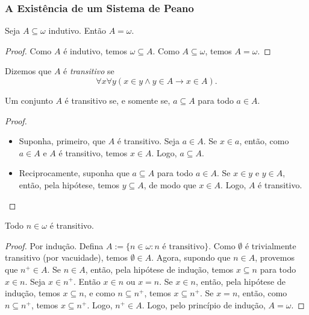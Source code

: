 \subsubsection{A Existência de um Sistema de Peano}

\begin{theorem} \label{teo.set:omega_indução}
    Seja $A \subseteq \omega$ indutivo. Então $A = \omega$.
\end{theorem}

\begin{proof}
    Como $A$ é indutivo, temos $\omega \subseteq A$. Como $A \subseteq \omega$, temos $A = \omega$. \blackproof
\end{proof}

\begin{definition}
    Dizemos que $A$ é \emph{transitivo} se
        \[
            \forall x \forall y (x \in y \land y \in A \rightarrow x \in A).
        \]
\end{definition}

\begin{proposition}
    Um conjunto $A$ é transitivo se, e somente se, $a \subseteq A$ para todo $a \in A$.    
\end{proposition}

\begin{proof}
    \leavevmode
        \begin{itemize}[align=left]
            \item[($\Rightarrow$)] Suponha, primeiro, que $A$ é transitivo. Seja $a \in A$. Se $x \in a$, então, como $a \in A$ e $A$ é transitivo, temos $x \in A$. Logo, $a \subseteq A$.
            \item[($\Leftarrow$)] Reciprocamente, suponha que $a \subseteq A$ para todo $a \in A$. Se $x \in y$ e $y \in A$, então, pela hipótese, temos $y \subseteq A$, de modo que $x \in A$. Logo, $A$ é transitivo.
        \end{itemize}
    \blackproof
\end{proof}

\begin{lemma}
    Todo $n \in \omega$ é transitivo.
\end{lemma}

\begin{proof}
    Por indução. Defina $A := \{n \in \omega : n \text{ é transitivo} \}$. Como $\emptyset$ é trivialmente transitivo (por vacuidade), temos $\emptyset \in A$. Agora, supondo que $n \in A$, provemos que $n^+ \in A$. Se $n \in A$, então, pela hipótese de indução, temos $x \subseteq n$ para todo $x \in n$. Seja $x \in n^+$. Então $x \in n$ ou $x=n$. Se $x \in n$, então, pela hipótese de indução, temos $x \subseteq n$, e como $n \subseteq n^+$, temos $x \subseteq n^+$. Se $x = n$, então, como $n \subseteq n^+$, temos $x \subseteq n^+$. Logo, $n^+ \in A$. Logo, pelo princípio de indução, $A = \omega$. \blackproof
\end{proof}


